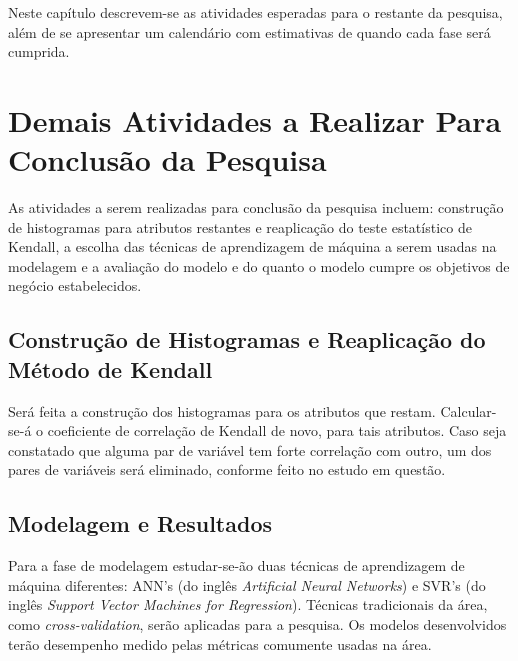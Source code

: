 Neste capítulo descrevem-se as atividades esperadas para o restante da pesquisa, além de
se apresentar um calendário com estimativas de quando cada fase será cumprida. 

\section{Demais Atividades a Realizar Para Conclusão da Pesquisa}
As atividades a serem realizadas para conclusão da pesquisa incluem: construção de
histogramas para atributos restantes e reaplicação do teste estatístico de Kendall, a
escolha das técnicas de aprendizagem de máquina a serem usadas na modelagem e a
avaliação do modelo e do quanto o modelo cumpre os objetivos de negócio
estabelecidos. 

\subsection{Construção de Histogramas e Reaplicação do Método de Kendall}
Será feita a construção dos histogramas para os atributos que restam. Calcular-se-á o
coeficiente de correlação de Kendall de novo, para tais atributos. Caso seja
constatado que alguma par de variável tem forte correlação com outro, um dos pares de
variáveis será eliminado, conforme feito no estudo em questão. 

\subsection{Modelagem e Resultados}
Para a fase de modelagem estudar-se-ão duas técnicas de aprendizagem de máquina
diferentes: ANN's (do inglês \textit{Artificial Neural Networks}) e 
SVR's (do inglês \textit{Support Vector Machines for Regression}). Técnicas
tradicionais da área, como \textit{cross-validation}, serão aplicadas para a
pesquisa. Os modelos desenvolvidos terão desempenho medido pelas métricas 
comumente usadas na área. 

